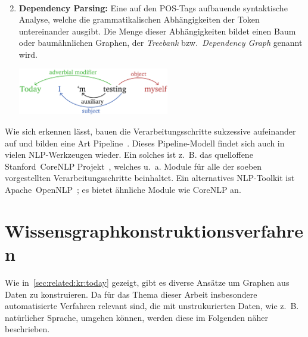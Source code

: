 \begin{enumerate}
\begin{align*}
		\end{align*}
	\item \textbf{Dependency Parsing:}
		Eine auf den POS-Tags aufbauende syntaktische Analyse, welche die grammatikalischen Abhängigkeiten der Token untereinander ausgibt.
		Die Menge dieser Abhängigkeiten bildet einen Baum oder baumähnlichen Graphen, der \textit{Treebank} bzw.\ \textit{Dependency Graph} genannt wird.
		\begin{center}
			\includegraphics[height=5.5em]{gfx/related-work/depParseExample1.pdf}
		\end{center}
\end{enumerate}

Wie sich erkennen lässt, bauen die Verarbeitungsschritte sukzessive aufeinander auf und bilden eine Art Pipeline~\cite{Pipeline}.
Dieses Pipeline-Modell findet sich auch in vielen NLP-Werkzeugen wieder.
Ein solches ist z.~B. das quelloffene Stanford~CoreNLP Projekt~\cite{Manning2014}\cite{CoreNLP}, welches u.~a. Module für alle der soeben vorgestellten Verarbeitungsschritte beinhaltet.
Ein alternatives NLP-Toolkit ist Apache~OpenNLP~\cite{OpenNLP};\@
es bietet ähnliche Module wie CoreNLP an.

\section{Wissensgraphkonstruktionsverfahren}%
\label{sec:related:kgc}

Wie in~\ref{sec:related:kr:today} gezeigt, gibt es diverse Ansätze um Graphen aus Daten zu konstruieren.
Da für das Thema dieser Arbeit insbesondere automatisierte Verfahren relevant sind, die mit unstrukurierten Daten, wie z.~B. natürlicher Sprache, umgehen können, werden diese im Folgenden näher beschrieben.

